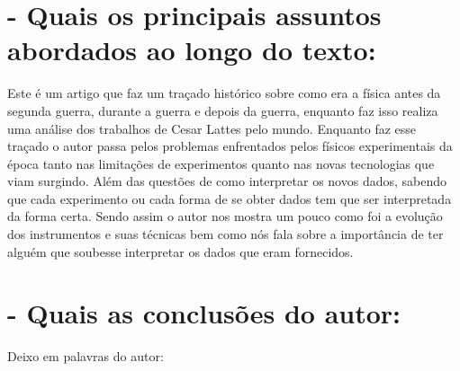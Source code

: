 \documentclass [a4paper, 12pt]{article}
\begin{document}
\section*{- Quais os principais assuntos abordados ao longo do texto:}

Este é um artigo que faz um traçado histórico sobre como era a física antes da segunda guerra, durante a guerra e depois da guerra, enquanto faz isso realiza uma análise dos trabalhos de Cesar Lattes pelo mundo. Enquanto faz esse traçado o autor passa pelos problemas enfrentados pelos físicos experimentais da época tanto nas limitações de experimentos quanto nas novas tecnologias que viam surgindo. Além das questões de como interpretar os novos dados, sabendo que cada experimento ou cada forma de se obter dados tem que ser interpretada da forma certa. Sendo assim o autor nos mostra um pouco como foi a evolução dos instrumentos e suas técnicas bem como nós fala sobre a importância de ter alguém que soubesse interpretar os dados que eram fornecidos.

\section*{- Quais as conclusões do autor:}

Deixo em palavras do autor:
\end{document}
